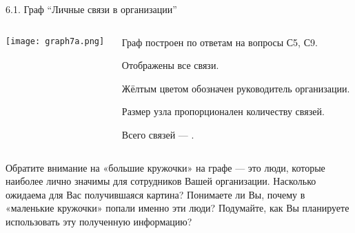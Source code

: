 \begin{frame}{6.1. Граф ``Личные связи в организации''}

\begin{columns}
\begin{column}{0.7\textwidth} 
\centering
          \texttt{[image: graph7a.png]}
\end{column}
\begin{column}{0.25\textwidth}
\tiny
Граф построен по ответам на вопросы С5, С9.
\smallskip

Отображены все связи. 
\smallskip

Жёлтым цветом обозначен руководитель организации.
\smallskip

Размер узла пропорционален количеству связей.
\bigskip

Всего связей --- \valGAlinks.

\end{column}
\end{columns}

\fontsize{6pt}{7}\selectfont
Обратите внимание на «большие кружочки» на графе --- это люди, которые наиболее лично значимы для сотрудников 
Вашей организации. Насколько ожидаема для Вас получившаяся картина? Понимаете ли Вы, почему в «маленькие кружочки» 
попали именно эти люди? Подумайте, как Вы планируете использовать эту полученную информацию?

\end{frame}


